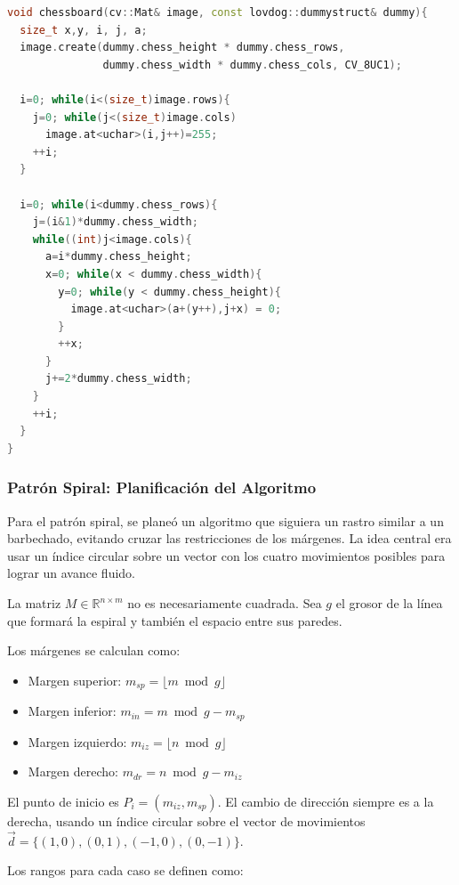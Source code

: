 \documentclass[10pt]{article}
\begin{document}
\begin{lstlisting}[language=C++, caption=Implementación Chessboard]
void chessboard(cv::Mat& image, const lovdog::dummystruct& dummy){
  size_t x,y, i, j, a;
  image.create(dummy.chess_height * dummy.chess_rows,
               dummy.chess_width * dummy.chess_cols, CV_8UC1);
  
  i=0; while(i<(size_t)image.rows){
    j=0; while(j<(size_t)image.cols) 
      image.at<uchar>(i,j++)=255; 
    ++i; 
  }
  
  i=0; while(i<dummy.chess_rows){
    j=(i&1)*dummy.chess_width;
    while((int)j<image.cols){
      a=i*dummy.chess_height;
      x=0; while(x < dummy.chess_width){
        y=0; while(y < dummy.chess_height){
          image.at<uchar>(a+(y++),j+x) = 0;
        }
        ++x;
      } 
      j+=2*dummy.chess_width;
    } 
    ++i;
  }
}
\end{lstlisting}

\subsubsection{Patrón Spiral: Planificación del Algoritmo}

Para el patrón spiral, se planeó un algoritmo que siguiera un rastro similar a un barbechado, evitando cruzar las restricciones de los márgenes. La idea central era usar un índice circular sobre un vector con los cuatro movimientos posibles para lograr un avance fluido.

La matriz $M \in \mathbb{R}^{n \times m}$ no es necesariamente cuadrada. Sea $g$ el grosor de la línea que formará la espiral y también el espacio entre sus paredes.

Los márgenes se calculan como:
\begin{itemize}
    \item Margen superior: $m_{sp} = \lfloor m \bmod g \rfloor$
    \item Margen inferior: $m_{in} = m \bmod g - m_{sp}$
    \item Margen izquierdo: $m_{iz} = \lfloor n \bmod g \rfloor$
    \item Margen derecho: $m_{dr} = n \bmod g - m_{iz}$
\end{itemize}

El punto de inicio es $P_i = (m_{iz}, m_{sp})$. El cambio de dirección siempre es a la derecha, usando un índice circular sobre el vector de movimientos $\vec{d} = \{(1,0), (0,1), (-1,0), (0,-1)\}$.

Los rangos para cada caso se definen como:
\end{document}
